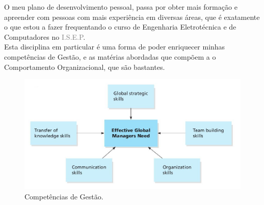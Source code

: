 O meu plano de desenvolvimento pessoal, passa por obter mais formação e apreender com pessoas com mais experiência em diversas áreas, que é exatamente o que estou a fazer frequentando o curso de Engenharia Eletrotécnica e de Computadores no \textcolor{gray}{I.S.E.P}.\\
Esta disciplina em particular é uma forma de poder enriquecer minhas competências de Gestão, e as matérias abordadas que compõem a o Comportamento Organizacional, que são bastantes.
\begin{figure}[H]
	\begin{minipage}{\linewidth}
		\centering
		\includegraphics[scale=0.3]{"./image/Skills/Managerial Skills for the Global Marketplace.jpg"}
	\end{minipage}
	\caption{Competências de Gestão. \cite{book_6}}
\end{figure}

